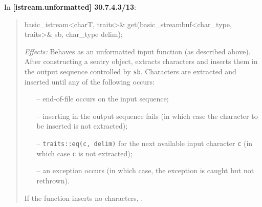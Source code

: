 \documentclass{wg21}
\begin{document}
In \textbf{[istream.unformatted] 30.7.4.3/13}:
\begin{quote}
\begin{codeblock}
basic_istream<charT, traits>& get(basic_streambuf<char_type, traits>& sb, char_type delim);
\end{codeblock}
\textit{Effects:} Behaves as an unformatted input function (as described above).
After constructing a sentry object, extracts characters and inserts them in the
output sequence controlled by \texttt{sb}. Characters are extracted and inserted
until any of the following occurs:
\begin{itemize}
  \item[--] end-of-file occurs on the input sequence;
  \item[--] inserting in the output sequence fails (in which case the character
            to be inserted is not extracted);
  \item[--] \texttt{traits::eq(c, delim)} for the next available input character
            \texttt{c} (in which case \texttt{c} is not extracted);
  \item[--] an exception occurs (in which case, the exception is caught
            but not rethrown).
\end{itemize}
If the function inserts no characters, .
\end{quote}
\end{document}
